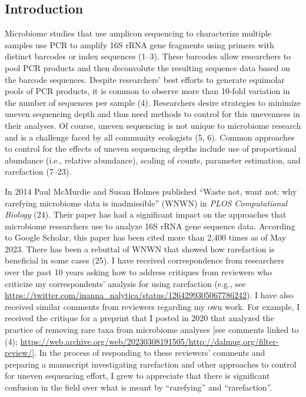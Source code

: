 \documentclass[
]{article}
\begin{document}
\newpage

\hypertarget{introduction}{%
\subsection{Introduction}\label{introduction}}

Microbiome studies that use amplicon sequencing to characterize multiple
samples use PCR to amplify 16S rRNA gene fragments using primers with
distinct barcodes or index sequences (1--3). These barcodes allow
researchers to pool PCR products and then deconvolute the resulting
sequence data based on the barcode sequences. Despite researchers' best
efforts to generate equimolar pools of PCR products, it is common to
observe more than 10-fold variation in the number of sequences per
sample (4). Researchers desire strategies to minimize uneven sequencing
depth and thus need methods to control for this unevenness in their
analyses. Of course, uneven sequencing is not unique to microbiome
research and is a challenge faced by all community ecologists (5, 6).
Common approaches to control for the effects of uneven sequencing depths
include use of proportional abundance (i.e., relative abundance),
scaling of counts, parameter estimation, and rarefaction (7--23).

In 2014 Paul McMurdie and Susan Holmes published ``Waste not, want not:
why rarefying microbiome data is inadmissible'' (WNWN) in \emph{PLOS
Computational Biology} (24). Their paper has had a significant impact on
the approaches that microbiome researchers use to analyze 16S rRNA gene
sequence data. According to Google Scholar, this paper has been cited
more than 2,400 times as of May 2023. There has been a rebuttal of WNWN
that showed how rarefaction is beneficial in some cases (25). I have
received correspondence from researchers over the past 10 years asking
how to address critiques from reviewers who criticize my correspondents'
analysis for using rarefaction (e.g., see
\url{https://twitter.com/inanna_nalytica/status/1264299305067786242}). I
have also received similar comments from reviewers regarding my own
work. For example, I received the critique for a preprint that I posted
in 2020 that analyzed the practice of removing rare taxa from microbiome
analyses {[}see comments linked to (4);
\url{https://web.archive.org/web/20230308191505/http://dalmug.org/filter-review/}{]}.
In the process of responding to these reviewers' comments and preparing
a manuscript investigating rarefaction and other approaches to control
for uneven sequencing effort, I grew to appreciate that there is
significant confusion in the field over what is meant by ``rarefying''
and ``rarefaction''.
\end{document}
